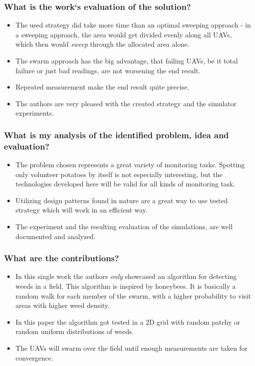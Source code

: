     \subsubsection*{What is the work`s evaluation of the solution?}
    \begin{itemize}
        \item The used strategy did take more time than an optimal sweeping approach - in a sweeping approach, the area would get divided evenly along all UAVs, which then would \emph{sweep} through the allocated area alone. 
        \item The swarm approach has the big advantage, that failing UAVs, be it total failure or just bad readings, are not worsening the end result. 
        \item Repeated measurement make the end result quite precise.
        \item The authors are very pleased with the created strategy and the simulator experiments.
    \end{itemize}
    \subsubsection*{What is my analysis of the identified problem, idea and evaluation?}
    \begin{itemize}
        \item The problem chosen represents a great variety of monitoring tasks. Spotting only volunteer potatoes by itself is not especially interesting, but the technologies developed here will be valid for all kinds of monitoring task.
        \item Utilizing design patterns found in nature are a great way to use tested strategy which will work in an efficient way.
        \item The experiment and the resulting evaluation of the simulations, are well documented and analyzed.
    \end{itemize}
    \subsubsection*{What are the contributions?}
    \begin{itemize}
        \item In this single work the authors \emph{only} showcased an algorithm for detecting weeds in a field. This algorithm is inspired by honeybees. It is basically a random walk for each member of the swarm, with a higher probability to visit areas with higher weed density.
        \item In this paper the algorithm got tested in a 2D grid with random patchy or random uniform distributions of weeds.
        \item The UAVs will swarm over the field until enough measurements are taken for convergence.
    \end{itemize}

